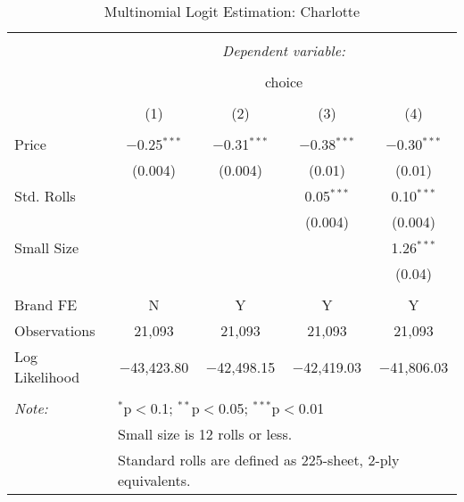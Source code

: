 
\begin{table}[!htbp] \centering 
  \caption{Multinomial Logit Estimation: Charlotte} 
  \label{tab:mnlCharlotteBaseline} 
\begin{tabular}{@{\extracolsep{5pt}}lcccc} 
\\[-1.8ex]\hline 
\hline \\[-1.8ex] 
 & \multicolumn{4}{c}{\textit{Dependent variable:}} \\ 
\cline{2-5} 
\\[-1.8ex] & \multicolumn{4}{c}{choice} \\ 
\\[-1.8ex] & (1) & (2) & (3) & (4)\\ 
\hline \\[-1.8ex] 
 Price & $-$0.25$^{***}$ & $-$0.31$^{***}$ & $-$0.38$^{***}$ & $-$0.30$^{***}$ \\ 
  & (0.004) & (0.004) & (0.01) & (0.01) \\ 
  Std. Rolls &  &  & 0.05$^{***}$ & 0.10$^{***}$ \\ 
  &  &  & (0.004) & (0.004) \\ 
  Small Size &  &  &  & 1.26$^{***}$ \\ 
  &  &  &  & (0.04) \\ 
 \hline \\[-1.8ex] 
Brand FE & N & Y & Y & Y \\ 
Observations & 21,093 & 21,093 & 21,093 & 21,093 \\ 
Log Likelihood & $-$43,423.80 & $-$42,498.15 & $-$42,419.03 & $-$41,806.03 \\ 
\hline 
\hline \\[-1.8ex] 
\textit{Note:}  & \multicolumn{4}{l}{$^{*}$p$<$0.1; $^{**}$p$<$0.05; $^{***}$p$<$0.01} \\ 
 & \multicolumn{4}{l}{Small size is 12 rolls or less.} \\ 
 & \multicolumn{4}{l}{Standard rolls are defined as 225-sheet, 2-ply equivalents.} \\ 
\end{tabular} 
\end{table} 
